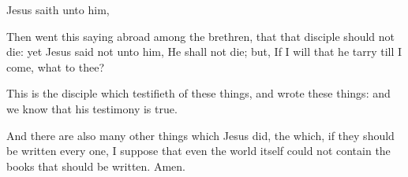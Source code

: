 {Jesus
saith unto
him,
{}

Then
went
this
saying
abroad
among the
brethren,
that
that
disciple
should
not
die:
yet
Jesus
said
not unto
him, He
shall
not
die;
but,
If I will
that
he
tarry
till I
come,
what
{}
to
thee?

This
is the
disciple
which
testifieth
of these
things,
and
wrote these
things:
and we
know
that
his
testimony
is
true.

And there
are
also
many other
things
which
Jesus
did, the
which,
if they should be
written
every
one, I suppose
that even the
world
itself
could
not
contain the
books that should be
written.
Amen.


\par }